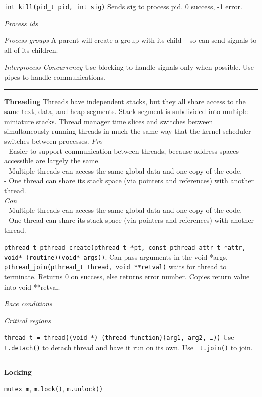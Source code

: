 \documentclass{article}
\begin{document}
\begin{multicols}{2}
  {\tt int kill(pid\_t pid, int sig)} Sends sig to process pid. 0 success, -1
  error.

  {\it Process ids} %

  {\it Process groups} A parent will create a group with its child -- so can
  send signals to all of its children.

  {\it Interprocess Concurrency} Use blocking to handle signals only when
  possible. Use pipes to handle communications.

  \noindent\rule{4cm}{0.4pt}

  {\bf Threading}
  Threads have independent stacks, but they all share access to the same text,
  data, and heap segments. Stack segment is subdivided into multiple miniature
  stacks. Thread manager time slices and switches between simultaneously running
  threads in much the same way that the kernel scheduler switches between
  processes.
  {\it Pro}\\
  - Easier to support communication between threads, because address spaces
  accessible are largely the same.\\
  - Multiple threads can access the same global data and one copy of the code.\\
  - One thread can share its stack space (via pointers and references) with
  another thread.\\
  {\it Con}\\
  - Multiple threads can access the same global data and one copy of the code.\\
  - One thread can share its stack space (via pointers and references) with
  another thread.

  {\tt pthread\_t pthread\_create(pthread\_t *pt, const pthread\_attr\_t *attr,
  void* (routine)(void* args))}. Can pass arguments in the void *args.\\
  {\tt pthread\_join(pthread\_t thread, void **retval)} waits for thread to
  terminate. Returns 0 on success, else returns error number. Copies return
  value into void **retval.

  {\it Race conditions}

  {\it Critical regions}

  {\tt thread t = thread((void *) (thread function)(arg1, arg2, \ldots))} Use
  {\tt t.detach()} to detach thread and have it run on its own. Use {\tt
  t.join()} to join.

  \noindent\rule{4cm}{0.4pt}

  {\bf Locking}

  {\tt mutex m}, {\tt m.lock()}, {\tt m.unlock()}


\end{multicols}
\end{document}
